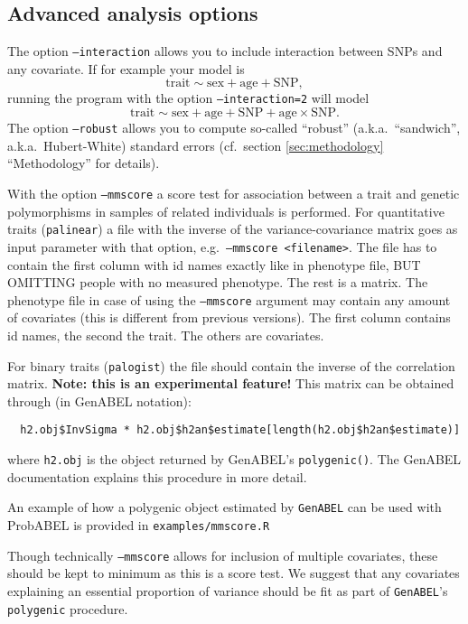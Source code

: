 \documentclass[12pt,a4paper]{article}
\newcommand{\GA}{\texttt{GenABEL}}
\begin{document}
\subsection{Advanced analysis options}
The option \texttt{--interaction} allows you to include interaction
between SNPs and any covariate. If for example your model is
\begin{equation*}
  \textrm{trait} \sim \textrm{sex} + \textrm{age} + \textrm{SNP},
\end{equation*}
running the program with the option \texttt{--interaction=2} will model
\begin{equation*}
  \textrm{trait} \sim \textrm{sex} + \textrm{age} + \textrm{SNP} +
  \textrm{age} \times \mathrm{SNP}.
\end{equation*}
The option \texttt{--robust} allows you to compute so-called
``robust'' (a.k.a.~``sandwich'', a.k.a.~Hubert-White) standard errors
(cf.~section \ref{sec:methodology} ``Methodology'' for details).

With the option \texttt{--mmscore} a score test for association
between a trait and genetic polymorphisms in samples of related
individuals is performed. For quantitative traits (\texttt{palinear})
a file with the inverse of the variance-covariance matrix goes as input
parameter with that option, e.g.~\texttt{--mmscore <filename>}. The
file has to contain the first column with id names exactly like in
phenotype file, BUT OMITTING people with no measured phenotype. The
rest is a matrix. The phenotype file in case of using the
\texttt{--mmscore} argument may contain any amount of covariates (this
is different from previous versions). The first column contains id
names, the second the trait. The others are covariates.

For binary traits (\texttt{palogist}) the file should contain the
inverse of the correlation matrix. \textbf{Note: this is an
  experimental feature!} This matrix can be obtained through (in
GenABEL notation):
\begin{verbatim}
  h2.obj$InvSigma * h2.obj$h2an$estimate[length(h2.obj$h2an$estimate)]
\end{verbatim}
where \texttt{h2.obj} is the object returned by GenABEL's
\texttt{polygenic()}. The GenABEL documentation explains this
procedure in more detail.

An example of how a polygenic object estimated by \GA{} can be used
with ProbABEL is provided in \texttt{examples/mmscore.R}

Though technically \texttt{--mmscore} allows for inclusion of multiple
covariates, these should be kept to minimum as this is a score test. We
suggest that any covariates explaining an essential proportion of
variance should be fit as part of \GA{}'s
\texttt{polygenic} procedure.
\end{document}
